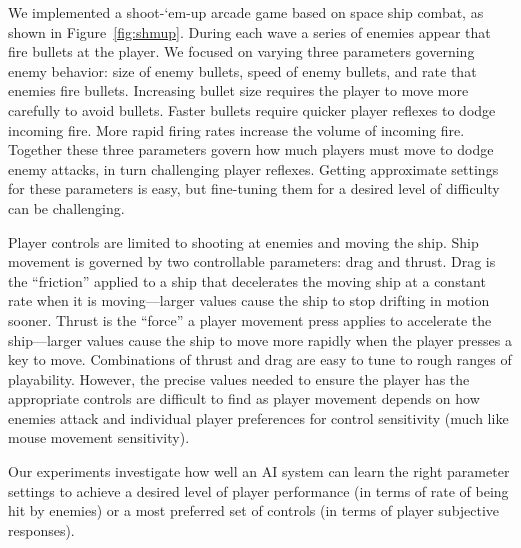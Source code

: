 \documentclass{sig-alternate}
\begin{document}
We implemented a shoot-`em-up arcade game based on space ship combat, as shown in Figure~\ref{fig:shmup}.
During each wave a series of enemies appear that fire bullets at the player. 
We focused on varying three parameters governing enemy behavior: size of enemy bullets, speed of enemy bullets, and rate that enemies fire bullets. 
Increasing bullet size requires the player to move more carefully to avoid bullets. 
Faster bullets require quicker player reflexes to dodge incoming fire. 
More rapid firing rates increase the volume of incoming fire. 
Together these three parameters govern how much players must move to dodge enemy attacks, in turn challenging player reflexes. 
Getting approximate settings for these parameters is easy, but fine-tuning them for a desired level of difficulty can be challenging. 

Player controls are limited to shooting at enemies and moving the ship. 
Ship movement is governed by two controllable parameters: drag and thrust. 
Drag is the ``friction'' applied to a ship that decelerates the moving ship at a constant rate when it is moving---larger values cause the ship to stop drifting in motion sooner. 
Thrust is the ``force'' a player movement press applies to accelerate the ship---larger values cause the ship to move more rapidly when the player presses a key to move. 
%
Combinations of thrust and drag are easy to tune to rough ranges of playability. 
However, the precise values needed to ensure the player has the appropriate controls are difficult to find as player movement depends on how enemies attack and individual player preferences for control sensitivity (much like mouse movement sensitivity). 

Our experiments investigate how well an AI system can learn the right parameter settings to achieve a desired level of player performance (in terms of rate of being hit by enemies) or a most preferred set of controls (in terms of player subjective responses).


\end{document}
